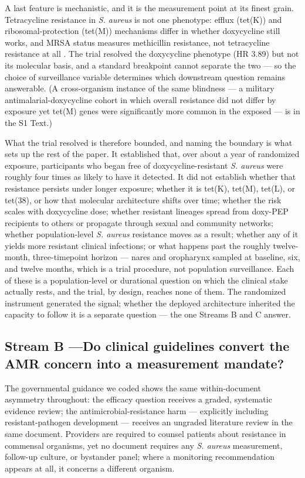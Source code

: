 \documentclass[10pt,letterpaper]{article}
\begin{document}
A last feature is mechanistic, and it is the measurement point at its
finest grain. Tetracycline resistance in \emph{S. aureus} is not one
phenotype: efflux (tet(K)) and ribosomal-protection (tet(M)) mechanisms
differ in whether doxycycline still works, and MRSA status measures
methicillin resistance, not tetracycline resistance at all
\cite{liu2011, grossman2016}. The trial resolved the doxycycline
phenotype (HR 3.89) but not its molecular basis, and a standard
breakpoint cannot separate the two --- so the choice of surveillance
variable determines which downstream question remains answerable. (A
cross-organism instance of the same blindness --- a military
antimalarial-doxycycline cohort in which overall resistance did not
differ by exposure yet tet(M) genes were significantly more common in
the exposed --- is in the S1 Text.)

What the trial resolved is therefore bounded, and naming the boundary is
what sets up the rest of the paper. It established that, over about a
year of randomized exposure, participants who began free of
doxycycline-resistant \emph{S. aureus} were roughly four times as likely
to have it detected. It did not establish whether that resistance
persists under longer exposure; whether it is tet(K), tet(M), tet(L), or
tet(38), or how that molecular architecture shifts over time; whether
the risk scales with doxycycline dose; whether resistant lineages spread
from doxy-PEP recipients to others or propagate through sexual and
community networks; whether population-level \emph{S. aureus} resistance
moves as a result; whether any of it yields more resistant clinical
infections; or what happens past the roughly twelve-month,
three-timepoint horizon --- nares and oropharynx sampled at baseline,
six, and twelve months, which is a trial procedure, not population
surveillance. Each of these is a population-level or durational question
on which the clinical stake actually rests, and the trial, by design,
reaches none of them. The randomized instrument generated the signal;
whether the deployed architecture inherited the capacity to follow it is
a separate question --- the one Streams B and C answer.

\subsection*{Stream B ---Do clinical guidelines convert the AMR concern into a measurement mandate?}

The governmental guidance we coded shows the same within-document
asymmetry throughout: the efficacy question receives a graded,
systematic evidence review; the antimicrobial-resistance harm ---
explicitly including resistant-pathogen development --- receives an
ungraded literature review in the same document. Providers are
required to counsel patients about resistance in commensal
organisms, yet no document requires any \emph{S. aureus}
measurement, follow-up culture, or bystander panel; where a monitoring
recommendation appears at all, it concerns a different organism.
\end{document}
